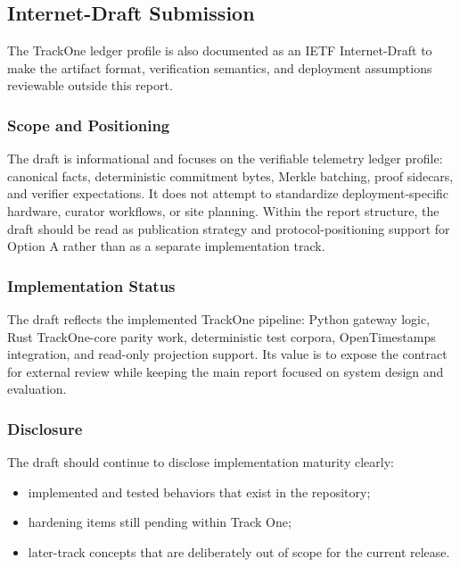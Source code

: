 \subsection{Internet-Draft Submission}
\label{subsec:internet-draft-submission}

The TrackOne ledger profile is also documented as an \ac{IETF} Internet-Draft to make the artifact format, verification semantics, and deployment assumptions reviewable outside this report.

\subsubsection{Scope and Positioning}
The draft is informational and focuses on the verifiable telemetry ledger profile: canonical facts, deterministic commitment bytes, Merkle batching, proof sidecars, and verifier expectations.
It does not attempt to standardize deployment-specific hardware, curator workflows, or site planning.
Within the report structure, the draft should be read as publication strategy and protocol-positioning support for Option A rather than as a separate implementation track.

\subsubsection{Implementation Status}
The draft reflects the implemented TrackOne pipeline: Python gateway logic, Rust TrackOne-core parity work, deterministic test corpora, OpenTimestamps integration, and read-only projection support.
Its value is to expose the contract for external review while keeping the main report focused on system design and evaluation.

\subsubsection{Disclosure}
The draft should continue to disclose implementation maturity clearly:
\begin{itemize}[nosep]
  \item implemented and tested behaviors that exist in the repository;
  \item hardening items still pending within Track One;
  \item later-track concepts that are deliberately out of scope for the current release.
\end{itemize}
